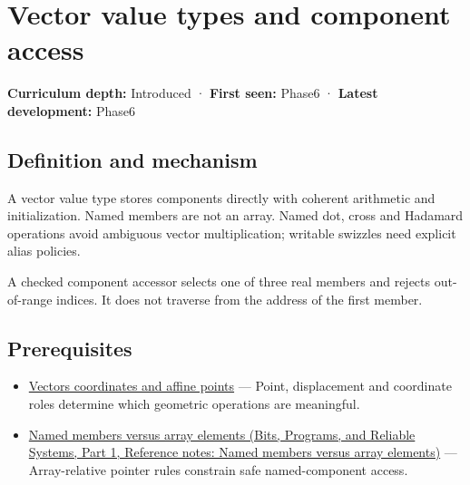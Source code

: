 \hypertarget{appendix-37a39984ba66}{}\label{referencestart:appendix-37a39984ba66}
\section{Vector value types and component access}\label{appendix-37a39984ba66-vector-value-types-and-component-access}

\hypertarget{appendix-37a39984ba66-vector-value-types-and-component-access}{}

\textbf{Curriculum depth:} Introduced · \textbf{First seen:} Phase6 · \textbf{Latest development:} Phase6

\begin{allmightroledefinition}

\subsection{Definition and mechanism}\label{appendix-37a39984ba66-definition-and-mechanism}

\hypertarget{appendix-37a39984ba66-definition-and-mechanism}{}

A vector value type stores components directly with coherent arithmetic and initialization. Named members are not an array. Named dot, cross and Hadamard operations avoid ambiguous vector multiplication; writable swizzles need explicit alias policies.

\end{allmightroledefinition}

A checked component accessor selects one of three real members and rejects out-of-range indices. It does not traverse from the address of the first member.

\subsection{Prerequisites}\label{appendix-37a39984ba66-prerequisites}

\hypertarget{appendix-37a39984ba66-prerequisites}{}

\begin{itemize}
\tightlist
\item
  \hyperref[appendix-0659864c0aa3]{Vectors coordinates and affine points} --- Point, displacement and coordinate roles determine which geometric operations are meaningful.
\item
  \href{../01-Bits-Programs-and-Reliable-Systems-P01/main.pdf\#nameddest=appendix-3f7e15effba6}{Named members versus array elements (Bits, Programs, and Reliable Systems, Part 1, Reference notes: Named members versus array elements)} --- Array-relative pointer rules constrain safe named-component access.
\end{itemize}

